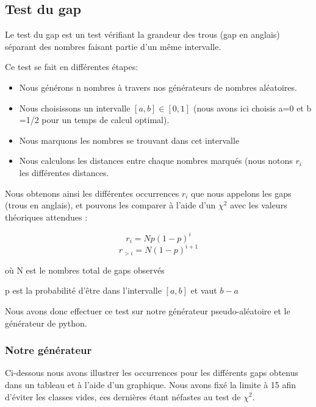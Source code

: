 \documentclass[10pt,a4paper]{article}
\begin{document}
	
\newpage
\subsection{Test du gap}
Le test du gap est un test vérifiant la grandeur des trous (gap en anglais) séparant des nombres faisant partie d'un même intervalle.

Ce test se fait en différentes étapes:
\begin{itemize}
\item Nous générons n nombres à travers nos générateurs de nombres aléatoires.
\item Nous choisissons un intervalle $[a,b]\in[0,1]$ (nous avons ici choisis a=0 et b =1/2 pour un temps de calcul optimal).
\item Nous marquons les nombres se trouvant dans cet intervalle
\item Nous calculons les distances entre chaque nombres marqués (nous notons $r_i$ les différentes distances. 
\end{itemize} 

Nous obtenons ainsi les différentes occurrences $r_i$ que nous appelons les gaps (trous en anglais), et pouvons les comparer à l'aide d'un $\chi^2$ avec les valeurs théoriques attendues :

\[
	r_i = N p (1-p)^i
\] 
\[
	r_{>i} = N (1-p)^{i+1}
\]

où N est le nombres total de gaps observés

p est la probabilité d'être dans l'intervalle $[a,b]$ et vaut $b-a$


Nous avons donc effectuer ce test sur notre générateur pseudo-aléatoire et le générateur de python.

	\subsubsection{Notre générateur}

Ci-dessous nous avons illustrer les occurrences pour les différents gaps obtenus dans un tableau et à l'aide d'un graphique. 
Nous avons fixé la limite à 15 afin d'éviter les classes vides, ces dernières étant néfastes au test de $\chi^2$.
\end{document}
